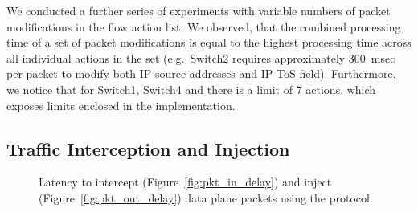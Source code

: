 We conducted a further series of experiments with variable numbers of packet
modifications in the flow action list. We observed, that the combined processing
time of a set of packet modifications is equal to the highest processing time
across all individual actions in the set (e.g.~Switch2 requires approximately
300~msec per packet to modify both IP source addresses and IP ToS field).
Furthermore, we notice that for Switch1, Switch4 and \ovs there is a limit of 7
actions, which exposes limits enclosed in the implementation.


\subsection{Traffic Interception and Injection}\label{sec:results-pktin}

\begin{figure}[t]
  \begin{center}
  \end{center}
  \caption[\texttt{pkt\_in} and \texttt{pkt\_out} processing latency]{Latency to
    intercept (Figure~\ref{fig:pkt_in_delay}) and inject
    (Figure~\ref{fig:pkt_out_delay}) data plane packets using the \of protocol.}
  \label{fig:pkt_in_out_delay}
\end{figure}

